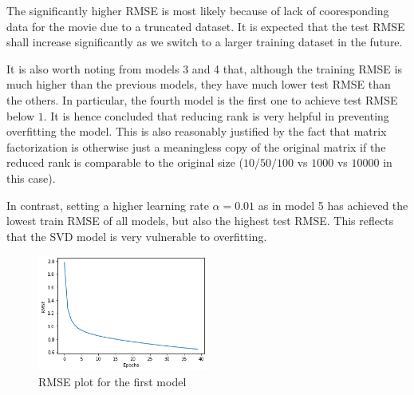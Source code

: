 \documentclass[final]{cvpr}
\begin{document}
\hspace{2em}


\hspace{10em}

The significantly higher RMSE is most likely because of lack of cooresponding data for the movie due to a truncated dataset.
It is expected that the test RMSE shall increase significantly as we switch to a larger training dataset in the future.

It is also worth noting from models 3 and 4 that,
although the training RMSE is much higher than the previous models,
they have much lower test RMSE than the others.
In particular, the fourth model is the first one to achieve test RMSE below $1$.
It is hence concluded that reducing rank is very helpful in preventing overfitting the model.
This is also reasonably justified by the fact that
matrix factorization is otherwise just a meaningless copy of the original matrix
if the reduced rank is comparable to the original size ($10/50/100$ vs $1000$ vs $10000$ in this case).

In contrast, setting a higher learning rate $\alpha = 0.01$ as in model 5
has achieved the lowest train RMSE of all models,
but also the highest test RMSE.
This reflects that the SVD model is very vulnerable to overfitting.

\begin{figure}
	\caption{RMSE plot for the first model}
	\includegraphics[width=0.5\textwidth]{./svd1.png}
\end{figure}
\end{document}
